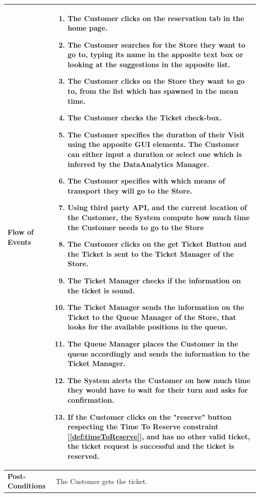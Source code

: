\documentclass[a4paper, 12pt, oneside]{article}
\begin{document}
\begin{tabularx}{\linewidth}{| l | X |}
    \hline
    \textbf{Flow of Events} & \parbox{0.7\textwidth}{   
        \begin{enumerate}
            \item The Customer clicks on the reservation tab in the home page.
            \item The Customer searches for the Store they want to go to, typing its name in the apposite text box or looking at the suggestions in the apposite list.
            \item The Customer clicks on the Store they want to go to, from the list which has spawned in the mean time.
            \item The Customer checks the Ticket check-box.
            \item The Customer specifies the duration of their Visit using the apposite GUI elements. The Customer can either input a duration or select one which is inferred by the DataAnalytics Manager.
            \item The Customer specifies with which means of transport they will go to the Store.
            \item Using third party API, and the current location of the Customer, the System compute how much time the Customer needs to go to the Store
            \item The Customer clicks on the get Ticket Button and the Ticket is sent to the Ticket Manager of the Store.
            \item The Ticket Manager checks if the information on the ticket is sound.
            \item The Ticket Manager sends the information on the Ticket to the Queue Manager of the Store, that looks for the available positions in the queue.
            \item The Queue Manager places the Customer in the queue accordingly and sends the information to the Ticket Manager.
            \item The System alerts the Customer on how much time they would have to wait for their turn and asks for confirmation.
            \item If the Customer clicks on the "reserve" button respecting the Time To Reserve constraint [\ref{def:timeToReserve}], and has no other valid ticket, the ticket request is successful and the ticket is reserved.
    \end{enumerate}}\\
    
    \hline
    \textbf{Post-Conditions} & The Customer gets the ticket.\\
    

\end{tabularx}
\end{document}
